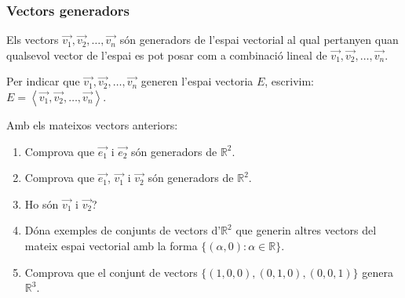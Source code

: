\documentclass{beamer}
\begin{document}
\begin{frame}
  \frametitle{Vectors generadors}

    Els vectors $\overrightarrow{v_1},\overrightarrow{v_2}, \ldots, \overrightarrow{v_n}$ són generadors de l'espai vectorial al qual pertanyen quan qualsevol vector de l'espai es pot posar com a combinació lineal de $\overrightarrow{v_1},\overrightarrow{v_2}, \ldots, \overrightarrow{v_n}$.

    Per indicar que $\overrightarrow{v_1},\overrightarrow{v_2}, \ldots, \overrightarrow{v_n}$ generen l'espai vectoria $E$, escrivim: $E=\left<\overrightarrow{v_1},\overrightarrow{v_2}, \ldots, \overrightarrow{v_n}\right>$.


  \begin{exercise}{}
    Amb els mateixos vectors anteriors:
    \begin{enumerate}
      \item Comprova que $\overrightarrow{e_1}$ i $\overrightarrow{e_2}$ són generadors de $\mathbb{R}^2$.
      \item Comprova que $\overrightarrow{e_1}$, $\overrightarrow{v_1}$ i $\overrightarrow{v_2}$ són generadors de $\mathbb{R}^2$.
      \item Ho són $\overrightarrow{v_1}$ i $\overrightarrow{v_2}$?
      \item Dóna exemples de conjunts de vectors d'$\mathbb{R}^2$ que generin altres vectors del mateix espai vectorial amb la forma $\{(\alpha,0):\alpha \in  \mathbb{R} \}$.
      \item Comprova que el conjunt de vectors $\{(1,0,0),(0,1,0),(0,0,1)\}$ genera $\mathbb{R}^3$.
    \end{enumerate}
  \end{exercise}
\end{frame}
\end{document}
